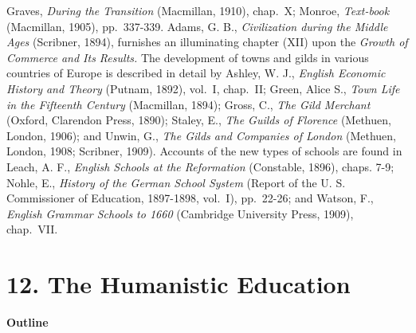 \documentclass[
]{book}
\begin{document}
Graves, \emph{During the Transition} (Macmillan, 1910), chap.~X; Monroe, \emph{Text-book} (Macmillan, 1905), pp.~337-339. Adams, G. B., \emph{Civilization during the Middle Ages} (Scribner, 1894), furnishes an illuminating chapter (XII) upon the \emph{Growth of Commerce and Its Results.} The development of towns and gilds in various countries of Europe is described in detail by Ashley, W. J., \emph{English Economic History and Theory} (Putnam, 1892), vol.~I, chap.~II; Green, Alice S., \emph{Town Life in the Fifteenth Century} (Macmillan, 1894); Gross, C., \emph{The Gild Merchant} (Oxford, Clarendon Press, 1890); Staley, E., \emph{The Guilds of Florence} (Methuen, London, 1906); and Unwin, G., \emph{The Gilds and Companies of London} (Methuen, London, 1908; Scribner, 1909). Accounts of the new types of schools are found in Leach, A. F., \emph{English Schools at the Reformation} (Constable, 1896), chaps. 7-9; Nohle, E., \emph{History of the German School System} (Report of the U. S. Commissioner of Education, 1897-1898, vol.~I), pp.~22-26; and Watson, F., \emph{English Grammar Schools to 1660} (Cambridge University Press, 1909), chap.~VII.

\hypertarget{the-humanistic-education}{%
\chapter{12. The Humanistic Education}\label{the-humanistic-education}}

\textbf{Outline}
\end{document}
